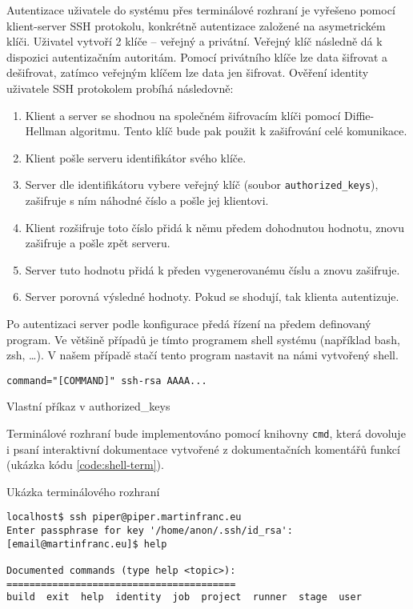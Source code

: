 Autentizace uživatele do systému přes terminálové rozhraní je vyřešeno pomocí klient-server SSH protokolu, konkrétně autentizace založené na asymetrickém klíči.
Uživatel vytvoří 2 klíče -- veřejný a privátní.
Veřejný klíč následně dá k dispozici autentizačním autoritám.
Pomocí privátního klíče lze data šifrovat a dešifrovat, zatímco veřejným klíčem lze data jen šifrovat.
Ověření identity uživatele SSH protokolem probíhá následovně:

\begin{enumerate}
    \item Klient a server se shodnou na společném šifrovacím klíči pomocí Diffie-Hellman algoritmu.
    Tento klíč bude pak použit k zašifrování celé komunikace.
    \item Klient pošle serveru identifikátor svého klíče.
    \item Server dle identifikátoru vybere veřejný klíč (soubor \verb|authorized_keys|), zašifruje s ním náhodné číslo a pošle jej klientovi.
    \item Klient rozšifruje toto číslo přidá k němu předem dohodnutou hodnotu, znovu zašifruje a pošle zpět serveru.
    \item Server tuto hodnotu přidá k předen vygenerovanému číslu a znovu zašifruje.
    \item Server porovná výsledné hodnoty. Pokud se shodují, tak klienta autentizuje.
\end{enumerate}

Po autentizaci server podle konfigurace předá řízení na předem definovaný program.
Ve většině případů je tímto programem shell systému (například bash, zsh, \ldots).
V našem případě stačí tento program nastavit na námi vytvořený shell.

\begin{listing}[ht]
\begin{verbatim}
command="[COMMAND]" ssh-rsa AAAA...
\end{verbatim}
\caption{Vlastní příkaz v authorized\_keys}
\end{listing}

Terminálové rozhraní bude implementováno pomocí knihovny \verb|cmd|, která dovoluje i psaní interaktivní dokumentace vytvořené z dokumentačních komentářů funkcí (ukázka kódu \ref{code:shell-term}).

\begin{listing}[ht]
\caption{\label{code:shell-term}Ukázka terminálového rozhraní}
\begin{verbatim}
localhost$ ssh piper@piper.martinfranc.eu
Enter passphrase for key '/home/anon/.ssh/id_rsa': 
[email@martinfranc.eu]$ help

Documented commands (type help <topic>):
========================================
build  exit  help  identity  job  project  runner  stage  user

\end{verbatim}
\end{listing}

